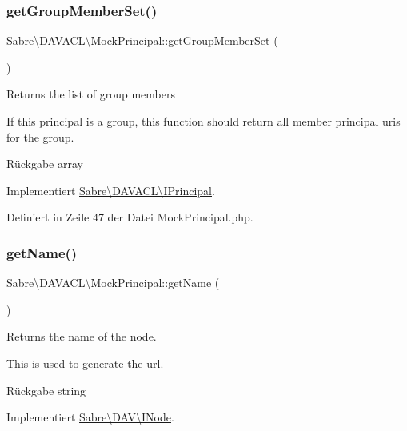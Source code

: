 \subsubsection{\texorpdfstring{get\+Group\+Member\+Set()}{getGroupMemberSet()}}
{\footnotesize\ttfamily Sabre\textbackslash{}\+D\+A\+V\+A\+C\+L\textbackslash{}\+Mock\+Principal\+::get\+Group\+Member\+Set (\begin{DoxyParamCaption}{ }\end{DoxyParamCaption})}

Returns the list of group members

If this principal is a group, this function should return all member principal uri\textquotesingle{}s for the group.

\begin{DoxyReturn}{Rückgabe}
array 
\end{DoxyReturn}


Implementiert \mbox{\hyperlink{interface_sabre_1_1_d_a_v_a_c_l_1_1_i_principal_ad9f9e4ed25ec5ec9325288b076cdd09f}{Sabre\textbackslash{}\+D\+A\+V\+A\+C\+L\textbackslash{}\+I\+Principal}}.



Definiert in Zeile 47 der Datei Mock\+Principal.\+php.

\mbox{\label{class_sabre_1_1_d_a_v_a_c_l_1_1_mock_principal_a844c0331a473eecaf455feefe8989a0f}} 
\subsubsection{\texorpdfstring{get\+Name()}{getName()}}
{\footnotesize\ttfamily Sabre\textbackslash{}\+D\+A\+V\+A\+C\+L\textbackslash{}\+Mock\+Principal\+::get\+Name (\begin{DoxyParamCaption}{ }\end{DoxyParamCaption})}

Returns the name of the node.

This is used to generate the url.

\begin{DoxyReturn}{Rückgabe}
string 
\end{DoxyReturn}


Implementiert \mbox{\hyperlink{interface_sabre_1_1_d_a_v_1_1_i_node_ab616fe836b1ae36af12126a2bc934dce}{Sabre\textbackslash{}\+D\+A\+V\textbackslash{}\+I\+Node}}.



